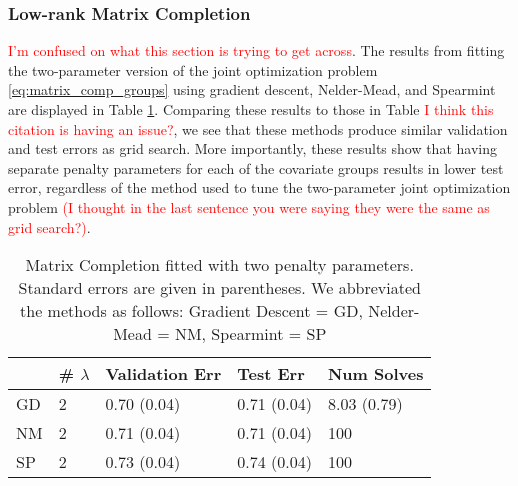 \documentclass[12pt,letterpaper]{article}
\begin{document}
\subsubsection{Low-rank Matrix Completion}
\textcolor{red}{I'm confused on what this section is trying to get across}. The results from fitting the two-parameter version of the joint optimization problem \eqref{eq:matrix_comp_groups} using gradient descent, Nelder-Mead, and Spearmint are displayed in Table \ref{table:two_param_matrix_completion}. Comparing these results to those in Table \label{table:matrix_completion} \textcolor{red}{I think this citation is having an issue?}, we see that these methods produce similar validation and test errors as grid search. More importantly, these results show that having separate penalty parameters for each of the covariate groups results in lower test error, regardless of the method used to tune the two-parameter joint optimization problem \textcolor{red}{(I thought in the last sentence you were saying they were the same as grid search?)}.

\begin{table}
	\caption{\label{table:two_param_matrix_completion} Matrix Completion fitted with two penalty parameters. Standard errors are given in parentheses. We abbreviated the methods as follows: Gradient Descent = GD, Nelder-Mead = NM, Spearmint = SP}
	\centering
	\begin{tabular}{| l | l | l | l | l |}
		\hline
		& \# $\lambda$ & Validation Err & Test Err &  Num Solves\\
		\hline
		GD & 2 & 0.70 (0.04) &  0.71 (0.04) & 8.03 (0.79) \\
		\hline
		NM & 2 & 0.71 (0.04) & 0.71 (0.04) & 100 \\
		\hline
		SP & 2 & 0.73 (0.04) & 0.74 (0.04) & 100\\
		\hline
	\end{tabular}
\end{table}



\end{document}
